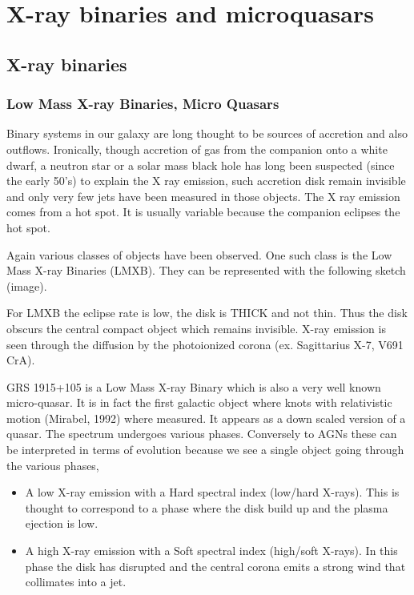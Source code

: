 \documentclass[10pt,a4paper,english]{article}
\begin{document}
\section{X-ray binaries and microquasars}

\subsection{X-ray binaries}

\subsubsection{Low Mass X-ray Binaries, Micro Quasars}

Binary systems in our galaxy are long thought to be sources of accretion and
also outflows. Ironically, though accretion of gas from the companion onto a
white dwarf, a neutron star or a solar mass black hole has long been suspected
(since the early 50's) to explain the X ray emission, such accretion disk
remain invisible and only very few jets have been measured in those objects.
The X ray emission comes from a hot spot. It is usually variable because the
companion eclipses the hot spot.

Again various classes of objects have been observed. One such class is the Low
Mass X-ray Binaries (LMXB). They can be represented with the following sketch
(image).

For LMXB the eclipse rate is low, the disk is THICK and not thin. Thus the disk
obscurs the central compact object which remains invisible. X-ray emission is
seen through the diffusion by the photoionized corona (ex. Sagittarius X-7,
V691 CrA).

GRS 1915+105 is a Low Mass X-ray Binary which is also a very well known
micro-quasar. It is in fact the first galactic object where knots with
relativistic motion (Mirabel, 1992) where measured. It appears as a down scaled
version of a quasar. The spectrum undergoes various phases. Conversely to AGNs
these can be interpreted in terms of evolution because we see a single object
going through the various phases,
\begin{itemize}
    \item A low X-ray emission with a Hard spectral index (low/hard X-rays).
          This is thought to correspond to a phase where the disk build up and
          the plasma ejection is low.
    \item A high X-ray emission with a Soft spectral index (high/soft X-rays).
          In this phase the disk has disrupted and the central corona emits a
          strong wind that collimates into a jet.
\end{itemize}
\end{document}

